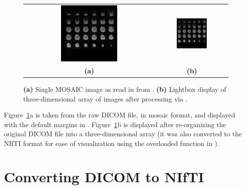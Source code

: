 \documentclass[article,nojss,shortnames]{jss}
\begin{document}
\begin{figure}[tbp]
  \begin{center}
    \begin{tabular}{cc}
      \includegraphics*[width=0.45\textwidth]{dcmImage.jpeg} & 
      \includegraphics*[width=0.45\textwidth]{dcmNifti.jpeg}\\
      \textbf{(a)} & \textbf{(b)}
    \end{tabular}
  \end{center}
  \caption{\textbf{(a)} Single MOSAIC image as read in from
    .  \textbf{(b)} Lightbox display of
    three-dimensional array of images after processing via
    .}
  \label{fig:mosaic}
\end{figure}

Figure~\ref{fig:mosaic}a is taken from the raw DICOM file, in mosaic
format, and displayed with the default margins in .
Figure~\ref{fig:mosaic}b is displayed after re-organizing the original
DICOM file into a three-dimensional array (it was also converted to
the NIfTI format for ease of visualization using the overloaded
 function in ).

\section{Converting DICOM to NIfTI}
\label{sec:dicom2nifti}
\end{document}
